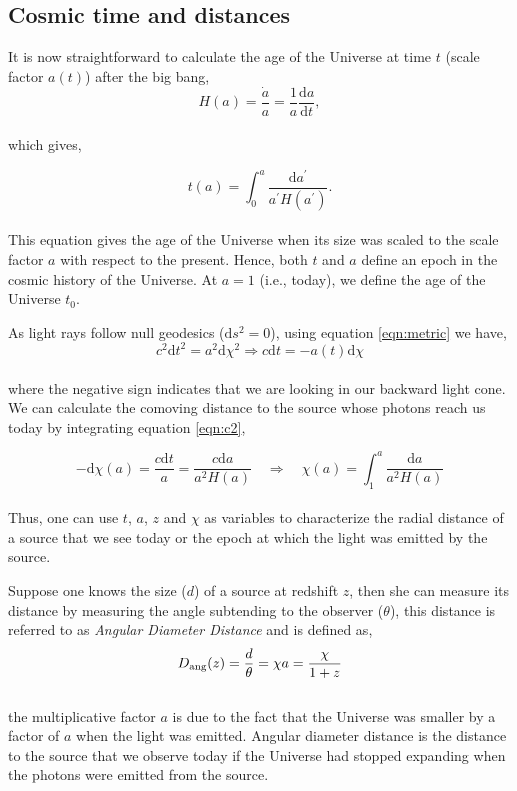 \subsection{Cosmic time and distances}


It is now straightforward to calculate the age of the Universe at time $t$ 
(scale factor $a(t)$) after the big bang,
\begin{equation}
	H(a) = \dfrac{\dot{a}}{a} = \dfrac{1}{a} \dfrac{\mathrm{d}a}{\mathrm{d}t},
\end{equation}
\\
which gives,

\begin{equation}
	t(a) = \int_0^a \dfrac{\mathrm{d}a^{\prime}}{a^{\prime}H(a^{\prime})}.
\end{equation}
\\
This equation gives the age of the Universe when its size was
scaled to the scale factor $a$ with respect to the present. Hence, both $t$ and
$a$ define an epoch in the cosmic history of the Universe. At $a=1$ (i.e., today),
we define the age of the Universe $t_0$.

As light rays follow null geodesics ($\mathrm{d}s^2=0$), using equation 
\ref{eqn:metric} we have,
\begin{equation}
	c^2\mathrm{d}t^2 = a^2\mathrm{d}\chi^2 \Rightarrow c\mathrm{d}t = -a(t)\mathrm{d}\chi
	\label{eqn:c2}
\end{equation}
\\
where the negative sign indicates that we are looking in our backward light cone. 
We can calculate the comoving distance to the source whose photons reach us
today by integrating equation \ref{eqn:c2},

\begin{equation}
	-\mathrm{d}\chi(a) = \dfrac{c\mathrm{d}t}{a} = 
	 \dfrac{c\mathrm{d}a}{a^2 H(a)} \quad
	 \Rightarrow \quad \chi(a) = \int_1^a \dfrac{\mathrm{d}a}{a^2H(a)}
\end{equation}
\\
Thus, one can use $t$, $a$, $z$ and $\chi$ as variables to characterize the
radial distance of a source that we see today or the epoch at which the light was
emitted by the source. 

Suppose one knows the size ($d$) of a source at redshift $z$, then she can measure its
distance by measuring the angle subtending to the observer ($\theta$), this distance is referred
to as {\it Angular Diameter Distance} and is defined as,
\begin{equation}
	D_{\rm ang}(z) = \dfrac{d}{\theta} = \chi a = \dfrac{\chi}{1+z}
\end{equation}
\\
the multiplicative factor $a$ is due to the fact that the Universe was smaller by 
a factor of $a$ when the light was emitted.  Angular diameter distance 
is the distance to the source that we observe today if the Universe had
stopped expanding when the photons were emitted from the source.

